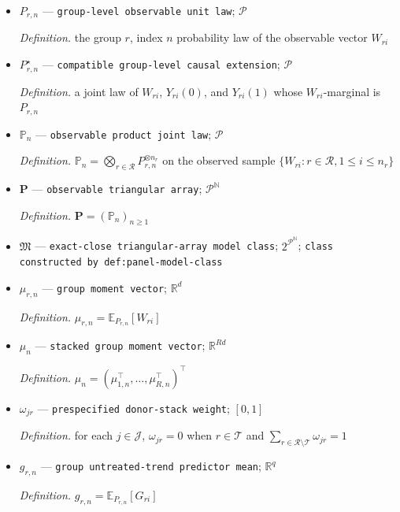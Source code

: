 \documentclass{article}
\begin{document}
\begin{itemize}
  \item \(P_{r,n}\) --- \texttt{group-\allowbreak{}level observable unit law}; \(\mathcal P\)
  \par\smallskip\noindent\emph{Definition.} the group \(r\), index \(n\) probability law of the observable vector \(W_{ri}\)
  \item \(P_{r,n}^{\star}\) --- \texttt{compatible group-\allowbreak{}level causal extension}; \(\mathcal P\)
  \par\smallskip\noindent\emph{Definition.} a joint law of \(W_{ri}\), \(Y_{ri}(0)\), and \(Y_{ri}(1)\) whose \(W_{ri}\)-marginal is \(P_{r,n}\)
  \item \(\mathbb P_n\) --- \texttt{observable product joint law}; \(\mathcal P\)
  \par\smallskip\noindent\emph{Definition.} \(\mathbb P_n=\bigotimes_{r\in\mathcal R}P_{r,n}^{\otimes n_r}\) on the observed sample \(\{W_{ri}:r\in\mathcal R,1\le i\le n_r\}\)
  \item \(\mathbf P\) --- \texttt{observable triangular array}; \(\mathcal P^{\mathbb N}\)
  \par\smallskip\noindent\emph{Definition.} \(\mathbf P=(\mathbb P_n)_{n\ge1}\)
  \item \(\mathfrak M\) --- \texttt{exact-\allowbreak{}close triangular-\allowbreak{}array model class}; \(2^{\mathcal P^{\mathbb N}}\); \texttt{class constructed by def:\allowbreak{}panel-\allowbreak{}model-\allowbreak{}class}
  \item \(\mu_{r,n}\) --- \texttt{group moment vector}; \(\mathbb R^d\)
  \par\smallskip\noindent\emph{Definition.} \(\mu_{r,n}=\mathbb E_{P_{r,n}}[W_{ri}]\)
  \item \(\mu_n\) --- \texttt{stacked group moment vector}; \(\mathbb R^{Rd}\)
  \par\smallskip\noindent\emph{Definition.} \(\mu_n=(\mu_{1,n}^{\top},\ldots,\mu_{R,n}^{\top})^{\top}\)
  \item \(\omega_{jr}\) --- \texttt{prespecified donor-\allowbreak{}stack weight}; \([0,1]\)
  \par\smallskip\noindent\emph{Definition.} for each \(j\in\mathcal J\), \(\omega_{jr}=0\) when \(r\in\mathcal T\) and \(\sum_{r\in\mathcal R\setminus\mathcal T}\omega_{jr}=1\)
  \item \(g_{r,n}\) --- \texttt{group untreated-\allowbreak{}trend predictor mean}; \(\mathbb R^q\)
  \par\smallskip\noindent\emph{Definition.} \(g_{r,n}=\mathbb E_{P_{r,n}}[G_{ri}]\)

\end{itemize}
\end{document}
